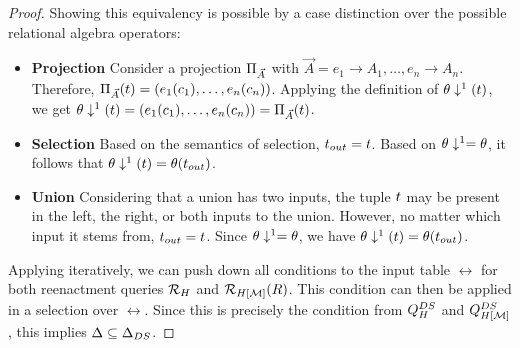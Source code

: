 \begin{proof}

Showing this equivalency is possible by a case distinction over the possible relational algebra operators:
\begin{itemize}
	\item \textbf{Projection} Consider a projection $\Pi_{\vec{A}}$ with $\vec{A} = e_1 \to A_1, \ldots, e_n \to A_n$. Therefore, $\Pi_{\vec{A}}(t) = (e_1(c_1), \ldots, e_n(c_n))$. Applying the definition of ${\theta}\downarrow^{1}(t)$, we get ${\theta}\downarrow^{1}(t) = (e_1(c_1), \ldots, e_n(c_n)) = \Pi_{\vec{A}}(t)$.
	\item \textbf{Selection} Based on the semantics of selection, $t_{out} = t$. Based on ${\theta}\downarrow^{1} = \theta$, it follows that ${\theta}\downarrow^{1}(t) = \theta(t_{out})$.
	\item \textbf{Union} Considering that a union has two inputs, the tuple $t$ may be present in the left, the right, or both inputs to the union. However, no matter which input it stems from, $t_{out} = t$. Since ${\theta}\downarrow^{1} = \theta$, we have ${\theta}\downarrow^{1}(t) = \theta(t_{out})$.
\end{itemize}

Applying  iteratively, we can push down all conditions to the input table $\rel$ for both reenactment queries $\mathcal{R}_{H}$ and $\mathcal{R}_{H[\mathcal{M}]}(R)$. This condition can then be applied in a selection over $\rel$. Since this is precisely the condition from $Q_{H}^{DS}$ and $Q_{H[\mathcal{M}]}^{DS}$, this implies $\Delta \subseteq \Delta_{DS}$.



\end{proof}
